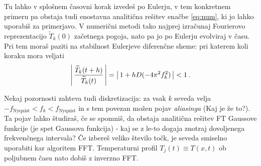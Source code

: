 \documentclass[slovene,11pt,a4paper]{article}
\begin{document}
\bigskip

Tu lahko v splošnem časovni korak izvedeš po Eulerju, v tem konkretnem primeru
pa obstaja tudi enostavna analitična rešitev enačbe \ref{eq:num}, ki jo lahko uporabiš za primerjavo.
V numerični metodi tako najprej izračunaj Fourierovo reprezentacijo $\widetilde{T}_k(0)$
začetnega pogoja, nato pa jo po Eulerju evolviraj v času.
Pri tem moraš paziti na stabilnost Eulerjeve diferenčne sheme:
pri katerem koli koraku mora veljati
\begin{equation*}
\left\vert \,
{\widetilde{T}_k(t+h)\over \widetilde{T}_k(t)} \,\right\vert
= \left\vert\, 1 + hD(-4\pi^2 f_k^2)\, \right\vert < 1 \>.
\end{equation*}

Nekaj pozornosti zahteva tudi diskretizacija: za vsak $k$
seveda velja  $-f_\mathrm{Nyquist} < f_k < f_\mathrm{Nyquist}$ in s tem povezan
mo\v zen pojav \emph{aliasinga} (Kaj je že to?). Ta pojav lahko \v studira\v s,
\v ce se spomni\v s, da obstaja analiti\v cna re\v sitev FT Gaussove funkcije (je spet Gaussova funkcija) - kaj se z le-to dogaja znotraj dovoljenega frekvenčnega intervala?
\v Ce izbereš veliko število točk, je seveda smiselno uporabiti kar algoritem FFT.
Temperaturni profil $T_j(t)\equiv T(x,t)$ ob poljubnem času
nato dobiš z inverzno FFT.

\bigskip
\end{document}
